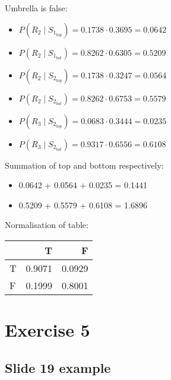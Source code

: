 \documentclass[colorlinks=true,linkcolor=blue]{article}
\begin{document}
Umbrella is false:
\begin{itemize}
\item $P(R_2 \mid S_{1_{top}}) = 0.1738 \cdot 0.3695 = 0.0642$
\item $P(R_2 \mid S_{1_{bot}}) = 0.8262 \cdot 0.6305 = 0.5209$
\item $P(R_2 \mid S_{2_{top}}) = 0.1738 \cdot 0.3247 = 0.0564$
\item $P(R_2 \mid S_{2_{bot}}) = 0.8262 \cdot 0.6753 = 0.5579$
\item $P(R_3 \mid S_{2_{top}}) = 0.0683 \cdot 0.3444 = 0.0235$
\item $P(R_3 \mid S_{2_{bot}}) = 0.9317 \cdot 0.6556 = 0.6108$
\end{itemize}

Summation of top and bottom respectively:
\begin{itemize}
\item 0.0642 + 0.0564 + 0.0235 = 0.1441
\item 0.5209 + 0.5579 + 0.6108 = 1.6896
\end{itemize}

Normalisation of table:
\begin{center}
\begin{tabular}{l|rr}
 & T & F\\
\hline
T & 0.9071 & 0.0929\\
F & 0.1999 & 0.8001\\
\end{tabular}
\end{center}
\section{Exercise 5}
\label{sec-5}
\subsection{Slide 19 example}
\label{sec-5-1}
\end{document}
